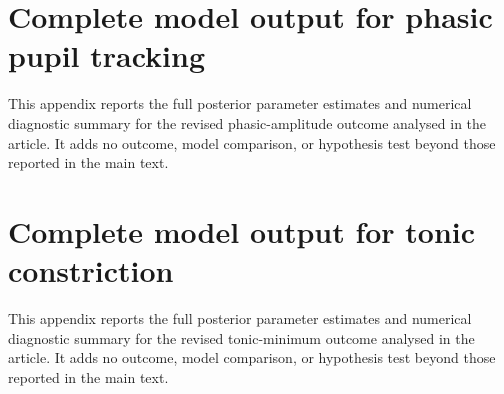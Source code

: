 \begin{appendixbox}
\label{app:phasic_model_details}
\section{Complete model output for phasic pupil tracking}

This appendix reports the full posterior parameter estimates and numerical diagnostic summary for the revised phasic-amplitude outcome analysed in the article. It adds no outcome, model comparison, or hypothesis test beyond those reported in the main text.
\end{appendixbox}


\clearpage

\clearpage

\begin{appendixbox}
\label{app:tonic_model_details}
\section{Complete model output for tonic constriction}

This appendix reports the full posterior parameter estimates and numerical diagnostic summary for the revised tonic-minimum outcome analysed in the article. It adds no outcome, model comparison, or hypothesis test beyond those reported in the main text.
\end{appendixbox}


\clearpage

\clearpage


